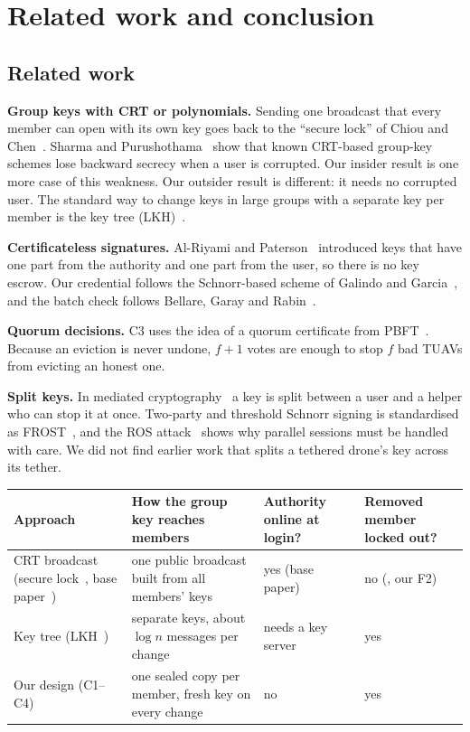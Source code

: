 \documentclass[11pt,openany]{report}
\begin{document}
\chapter{Related work and conclusion}\label{ch:concl}
\section{Related work}
\textbf{Group keys with CRT or polynomials.} Sending one broadcast that every member can open with its own key goes back to the ``secure lock'' of
Chiou and Chen~\cite{chiou89}. Sharma and Purushothama~\cite{sp24} show that known CRT-based group-key schemes lose backward secrecy when a user is
corrupted. Our insider result is one more case of this weakness. Our outsider result is different: it needs no corrupted user. The standard way to
change keys in large groups with a separate key per member is the key tree (LKH)~\cite{wgl98}.

\textbf{Certificateless signatures.} Al-Riyami and Paterson~\cite{alriyami} introduced keys that have one part from the authority and one part from
the user, so there is no key escrow. Our credential follows the Schnorr-based scheme of Galindo and Garcia~\cite{gg09}, and the batch check follows
Bellare, Garay and Rabin~\cite{bgr}.

\textbf{Quorum decisions.} C3 uses the idea of a quorum certificate from PBFT~\cite{castro99}. Because an eviction is never undone, $f+1$ votes are
enough to stop $f$ bad TUAVs from evicting an honest one.

\textbf{Split keys.} In mediated cryptography~\cite{bdtw01,cbn06} a key is split between a user and a helper who can stop it at once. Two-party and
threshold Schnorr signing is standardised as FROST~\cite{rfc9591}, and the ROS attack~\cite{ros21} shows why parallel sessions must be handled with
care. We did not find earlier work that splits a tethered drone's key across its tether.

\begin{center}
\small
\begin{tabularx}{\linewidth}{@{}p{3.3cm} X X X@{}}
\toprule
\textbf{Approach} & \textbf{How the group key reaches members} & \textbf{Authority online at login?} & \textbf{Removed member locked out?}\\
\midrule
CRT broadcast (secure lock~\cite{chiou89}, base paper~\cite{tan2023}) & one public broadcast built from all members' keys & yes (base paper) & no (\cite{sp24}, our F2)\\
Key tree (LKH~\cite{wgl98}) & separate keys, about $\log n$ messages per change & needs a key server & yes\\
Our design (C1--C4) & one sealed copy per member, fresh key on every change & no & yes\\
\bottomrule
\end{tabularx}
\end{center}
\end{document}
